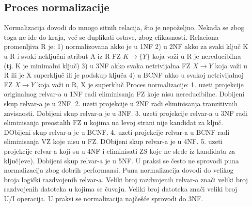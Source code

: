 \documentclass{article}
\begin{document}
\subsection{Proces normalizacije}
Normalizacija dovodi do mnogo sitnih relacija, što je
nepoželjno. Nekada se zbog toga ne ide do kraja, već se
duplikati ostave, zbog efikasnosti.
\newline 
Relaciona promenljiva R je:
\newline \hspace*{0.4cm}1) normalizovana akko je u 1NF
\newline \hspace*{0.4cm}2) u 2NF akko za svaki ključ K u R i
svaki neključni atribut A iz R FZ $K \rightarrow \{Y\}$ koja
važi u R je nereducibilna (tj. K je minimalni ključ)
\newline \hspace*{0.4cm}3) u 3NF akko svaka netrivijalna FZ
$X \rightarrow Y$ koja važi u R ili je X superključ ili je
podskup ključa
\newline \hspace*{0.4cm}4) u BCNF akko u svakoj netrivijalnoj
FZ $X \rightarrow Y$ koja važi u R, X je superkluč
\vspace{0.3cm} \newline
Proces normalizacije:
\newline \hspace*{0.4cm}1. uzeti projekcije originalnog
relvar-a u 1NF radi eliminisanja FZ koje nisu nereducibilne.
Dobijeni skup relvar-a je u 2NF.
\newline \hspace*{0.4cm}2. uzeti projekcije u 2NF radi
eliminisanja tranzitivnih zavisnosti. Dobijeni skup relvar-a
je u 3NF.
\newline \hspace*{0.4cm}3. uzeti projekcije relvar-a u 3NF
radi eliminisanja preostalih FZ u kojima na levoj strani nije
kandidat za ključ. DObijeni skup relvar-a je u BCNF.
\newline \hspace*{0.4cm}4. uzeti projekcije relvar-a u BCNF
radi eliminisanja VZ koje nisu u FZ. DObijeni skup relvar-a
je u 4NF.
\newline \hspace*{0.4cm}5. uzeti projekcije relvar-a koji su
u 4NF i eliminisati ZS koje ne slede iz kandidata za
ključ(eve). Dobijeni skup relvar-a je u 5NF.
\vspace{0.2cm}\newline
U praksi se često ne sprovodi puna normalizacija zbog dobrih
performansi. Puna normalizacija dovodi do velikog broja
logički razdvojenih relvar-a. Veliki broj razdvojenih
relvar-a znači veliki broj razdvojenih datoteka u kojima se
čuvaju. Veliki broj datoteka znači veliki broj U/I operacija.
U praksi se normalizacija najčešće sprovodi do 3NF.
\newpage
\end{document}

